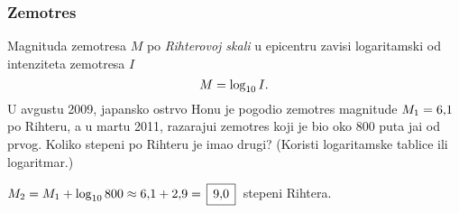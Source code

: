 \subsubsection{Zem{\lj}otres}

\zadatak Magnituda zem{\lj}otresa $M$ po {\sl Rihterovoj skali\/} u epicentru zavisi logaritamski od 
inten\-zi\-te\-ta zem{\lj}otresa $I$
$$
M=\log_{10} I.
$$
U avgustu 2009, japansko ostrvo Hon{\sv}u 
je pogodio zem{\lj}otres magnitude $M_1=6\.1$ po Rihteru, a u martu 2011,
razaraju{\cc}i zem{\lj}otres koji je bio oko 800 puta ja{\cv}i od prvog. Koliko stepeni po Rihteru je imao drugi?
(Koristi logaritamske tablice ili logaritmar.)

\resenje $M_2 = M_1 + \logten 800 \approx 6\.1 + 2\.9 = \ram{9\.0}$ stepeni Rihtera. 
